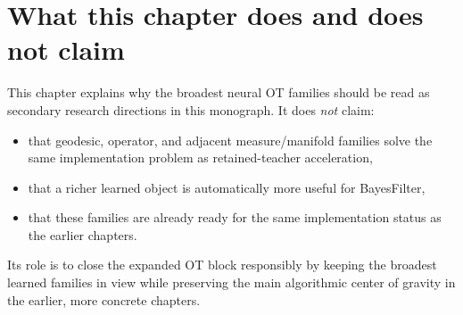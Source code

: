 \section{What this chapter does and does not claim}
\label{sec:bf-neural-ot-dynamic-boundary}

This chapter explains why the broadest neural OT families should be read as
secondary research directions in this monograph.  It does \emph{not} claim:
\begin{itemize}
  \item that geodesic, operator, and adjacent measure/manifold families solve the
  same implementation problem as retained-teacher acceleration,
  \item that a richer learned object is automatically more useful for BayesFilter,
  \item that these families are already ready for the same implementation status as
  the earlier chapters.
\end{itemize}
Its role is to close the expanded OT block responsibly by keeping the broadest
learned families in view while preserving the main algorithmic center of gravity
in the earlier, more concrete chapters.

\FloatBarrier
